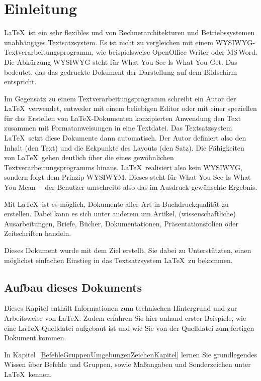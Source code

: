 \chapter{Einleitung}

\LaTeX\ ist ein sehr flexibles und von Rechnerarchitekturen
und Betriebssystemen unabhängiges 
Textsatzsystem. Es ist nicht zu vergleichen mit einem WYSIWYG-Textverarbeitungsprogramm, wie beispielsweise OpenOffice Writer oder MS\,Word. Die Abkürzung WYSIWYG steht für \glqq What You See Is What You Get\grqq. Das bedeutet, das das gedruckte Dokument der Darstellung auf dem Bildschirm entspricht. 

Im Gegensatz zu einem Textverarbeitungsprogramm schreibt ein Autor der \LaTeX\ verwendet, entweder mit einem beliebigen Editor oder mit einer speziellen für das Erstellen von \LaTeX-Dokumenten konzipierten Anwendung
den Text zusammen mit Formatanweisungen in eine Textdatei. 
Das Textsatzsystem \LaTeX\ setzt diese Dokumente dann automatisch. Der Autor definiert also den Inhalt (den
Text) und die Eckpunkte des Layouts (den Satz). Die Fähigkeiten 
von \LaTeX\ gehen deutlich über die eines 
gewöhnlichen Textverarbeitungsprogramms hinaus. \LaTeX\ realisiert also kein WYSIWYG, sondern folgt dem Prinzip WYSIWYM. Dieses steht für \glqq What You See Is What You Mean\grqq\ -- der Benutzer umschreibt also das im Ausdruck gewünschte Ergebnis.

Mit \LaTeX\ ist es möglich, Dokumente aller Art in Buchdruckqualität zu erstellen.
Dabei kann es sich unter anderem um Artikel, (wissenschaftliche)
Ausarbeitungen, Briefe, Bücher, Dokumentationen, Präsentationsfolien oder
Zeitschriften handeln. 

Dieses Dokument wurde mit dem Ziel erstellt, Sie dabei zu Unterstützten, einen möglichst einfachen Einstieg in das Textsatzsystem \LaTeX\ zu bekommen.

\section{Aufbau dieses Dokuments}

Dieses Kapitel enthält Informationen zum technischen Hintergrund und zur Arbeitsweise von \LaTeX. Zudem erfahren Sie hier anhand erster Beispiele, wie eine \LaTeX-Quelldatei aufgebaut ist und wie Sie von der Quelldatei zum fertigen Dokument kommen. 

In Kapitel~\ref{BefehleGruppenUmgebungenZeichenKapitel} lernen Sie grundlegendes Wissen über Befehle und Gruppen, sowie Maßangaben und Sonderzeichen unter \LaTeX\ kennen. 


